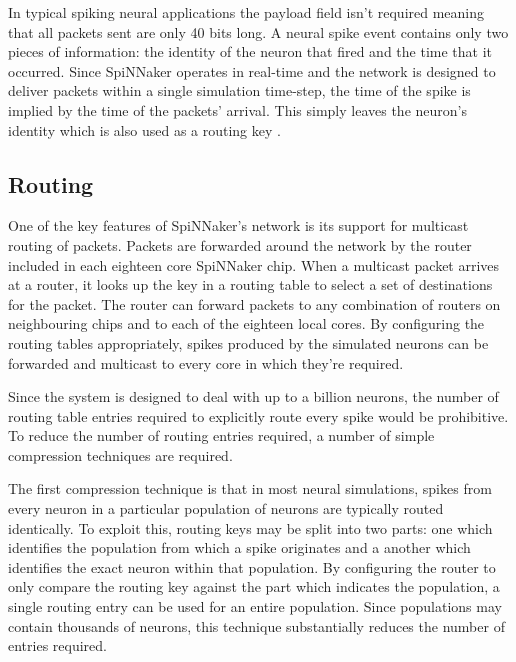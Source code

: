 			In typical spiking neural applications the payload field isn't required
			meaning that all packets sent are only 40 bits long. A neural spike event
			contains only two pieces of information: the identity of the neuron that
			fired and the time that it occurred. Since SpiNNaker operates in real-time
			and the network is designed to deliver packets within a single simulation
			time-step, the time of the spike is implied by the time of the packets'
			arrival. This simply leaves the neuron's identity which is also used as a
			routing key \cite{davies12}.
		
		\subsection{Routing}
			
			\label{sec:spinn-router}
			
			One of the key features of SpiNNaker's network is its support for
			multicast routing of packets. Packets are forwarded around the network by
			the router included in each eighteen core SpiNNaker chip. When a multicast
			packet arrives at a router, it looks up the key in a routing table to
			select a set of destinations for the packet. The router can forward
			packets to any combination of routers on neighbouring chips and to each of
			the eighteen local cores. By configuring the routing tables appropriately,
			spikes produced by the simulated neurons can be forwarded and multicast to
			every core in which they're required.
			
			Since the system is designed to deal with up to a billion neurons, the
			number of routing table entries required to explicitly route every spike
			would be prohibitive. To reduce the number of routing entries required, a
			number of simple compression techniques are required.
			
			The first compression technique is that in most neural simulations, spikes
			from every neuron in a particular population of neurons are typically
			routed identically. To exploit this, routing keys may be split into two
			parts: one which identifies the population from which a spike originates
			and a another which identifies the exact neuron within that population.
			By configuring the router to only compare the routing key against the part
			which indicates the population, a single routing entry can be used for an
			entire population. Since populations may contain thousands of neurons,
			this technique substantially reduces the number of entries required.
			

